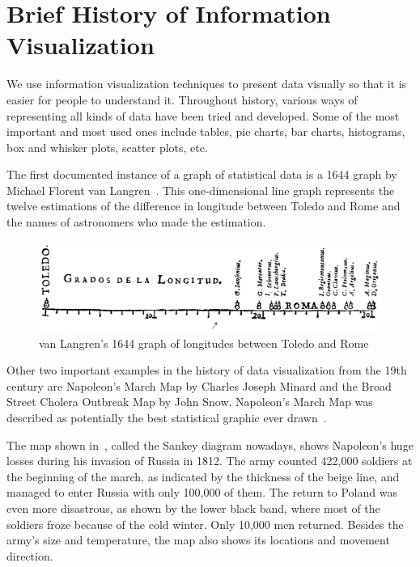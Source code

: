 \clearpage

\section{Brief History of Information Visualization}\label{sec:history-information-visualization}

We use information visualization techniques to present data visually so that it is easier for people to understand it.
Throughout history, various ways of representing all kinds of data have been tried and developed. Some of the most
important and most used ones include tables, pie charts, bar charts, histograms, box and whisker plots, scatter plots, etc.

The first documented instance of a graph of statistical data is a 1644 graph by Michael Florent van Langren~\citep{friendly2010first}.
This one-dimensional line graph represents the twelve estimations of the difference in longitude between Toledo and
Rome and the names of astronomers who made the estimation.

\begin{figure}[h]
    \begin{center}
        \includegraphics[width=\textwidth]{graphics/2-literature-review/1}
    \end{center}
    \caption{van Langren's 1644 graph of longitudes between Toledo and Rome~\citep{friendly2010first}}
    \label{fig:figure2.1}
\end{figure}

Other two important examples in the history of data visualization from the 19th century are Napoleon’s March Map
by Charles Joseph Minard and the Broad  Street Cholera Outbreak Map by John Snow. Napoleon’s March Map was described as
potentially the best statistical graphic ever drawn~\citep{tufte2001visual}.

The map shown in~, called the Sankey diagram nowadays, shows Napoleon’s huge losses during
his invasion of Russia in 1812. The army counted 422,000 soldiers at the beginning of the march, as indicated by the
thickness of the beige line, and managed to enter Russia with only 100,000 of them. The return to Poland was even more
disastrous, as shown by the lower black band, where most of the soldiers froze because of the cold winter. Only 10,000
men returned. Besides the army’s size and temperature, the map also shows its locations and movement direction.

